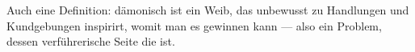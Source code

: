 Auch eine Definition: dämonisch ist ein Weib, das unbewusst zu Handlungen und Kundgebungen inspirirt, womit man es  gewinnen kann — also ein Problem, dessen verführerische Seite die  ist.
\par

